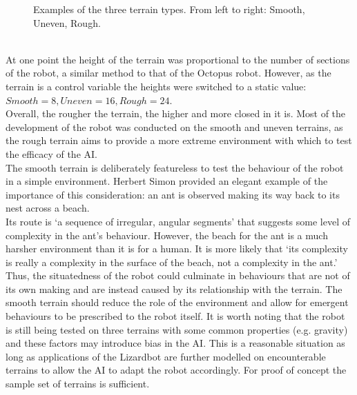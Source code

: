\documentclass{article}
\begin{document}
\begin{figure}[h]
\caption{Examples of the three terrain types. From left to right: Smooth, Uneven, Rough.}
\end{figure}\\
At one point the height of the terrain was proportional to the number of sections of the robot, a similar method to that of the Octopus robot. However, as the terrain is a control variable the heights were switched to a static value: $Smooth=8, Uneven=16, Rough=24$.\\
Overall, the rougher the terrain, the higher and more closed in it is. Most of the development of the robot was conducted on the smooth and uneven terrains, as the rough terrain aims to provide a more extreme environment with which to test the efficacy of the AI.\\
The smooth terrain is deliberately featureless to test the behaviour of the robot in a simple environment. Herbert Simon provided an elegant example of the importance of this consideration: an ant is observed making its way back to its nest across a beach.\\
Its route is ‘a sequence of irregular, angular segments’ that suggests some level of complexity in the ant's behaviour. However, the beach for the ant is a much harsher environment than it is for a human. It is more likely that ‘its complexity is really a complexity in the surface of the beach, not a complexity in the ant.’  Thus, the situatedness of the robot could culminate in behaviours that are not of its own making and are instead caused by its relationship with the terrain. The smooth terrain should reduce the role of the environment and allow for emergent behaviours to be prescribed to the robot itself. It is worth noting that the robot is still being tested on three terrains with some common properties (e.g. gravity) and these factors may introduce bias in the AI. This is a reasonable situation as long as applications of the Lizardbot are further modelled on encounterable terrains to allow the AI to adapt the robot accordingly. For proof of concept the sample set of terrains is sufficient.
\end{document}

